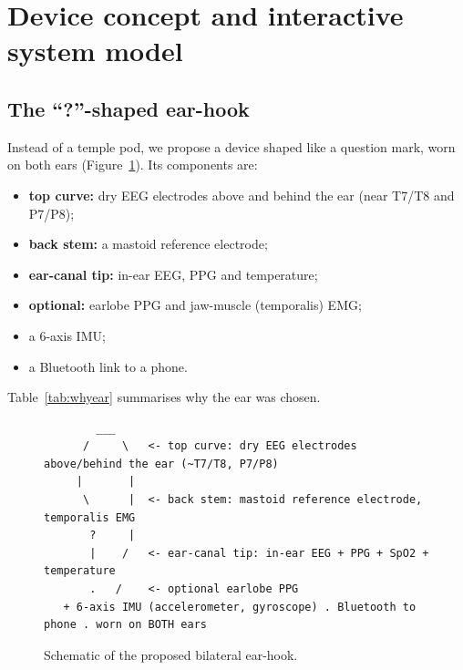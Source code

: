 \section{Device concept and interactive system model}
\label{app:livelab}

\subsection{The ``?''-shaped ear-hook}

Instead of a temple pod, we propose a device shaped like a question mark, worn on both ears (Figure~\ref{fig:hook}). Its components are:
\begin{itemize}
\item \textbf{top curve:} dry EEG electrodes above and behind the ear (near T7/T8 and P7/P8);
\item \textbf{back stem:} a mastoid reference electrode;
\item \textbf{ear-canal tip:} in-ear EEG, PPG and temperature;
\item \textbf{optional:} earlobe PPG and jaw-muscle (temporalis) EMG;
\item a 6-axis IMU;
\item a Bluetooth link to a phone.
\end{itemize}
Table~\ref{tab:whyear} summarises why the ear was chosen.

\begin{figure}[htbp]
\centering
{\footnotesize
\begin{verbatim}
        ___
      /     \   <- top curve: dry EEG electrodes above/behind the ear (~T7/T8, P7/P8)
     |       |
      \      |  <- back stem: mastoid reference electrode, temporalis EMG
       ?     |
       |    /   <- ear-canal tip: in-ear EEG + PPG + SpO2 + temperature
       .   /    <- optional earlobe PPG
   + 6-axis IMU (accelerometer, gyroscope) . Bluetooth to phone . worn on BOTH ears
\end{verbatim}
}
\caption{Schematic of the proposed bilateral ear-hook.}
\label{fig:hook}
\end{figure}

